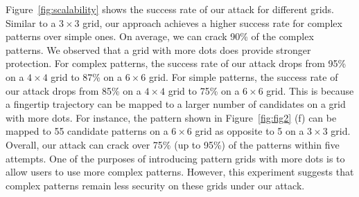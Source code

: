         Figure~\ref{fig:scalability} shows the success rate of our attack
        for different grids. Similar to a $3 \times 3$ grid, our
        approach achieves a higher success rate for complex patterns over
        simple ones. On average, we can crack 90\% of the complex patterns.
        We observed that a grid with more dots does provide
        stronger protection. For complex patterns, the success rate of our
        attack drops from 95\% on a $4 \times 4$ grid to 87\% on a $6 \times
        6$ grid. For simple patterns, the success rate of our attack drops
        from 85\% on a $4 \times 4$ grid to 75\% on a $6 \times 6$ grid. This
        is because a fingertip trajectory can be mapped to a larger number of
        candidates on a grid with more dots. For instance, the pattern shown
        in Figure~\ref{fig:fig2} (f) can be mapped to 55
        candidate patterns on a $6 \times 6$ grid as opposite to 5 on a $3
        \times 3$ grid. Overall, our attack can crack over 75\% (up to 95\%)
        of the patterns within five attempts. One of the purposes of introducing
        pattern grids with more dots is to allow users to use more complex
        patterns. However, this experiment suggests that complex patterns remain less security on these grids under our attack.

